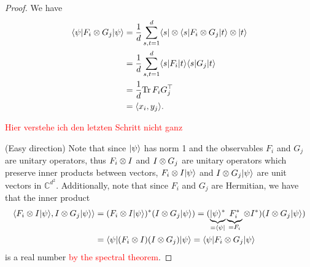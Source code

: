 \begin{proof}
	We have
	\begin{align*}
		\langle {\psi} \vert F_i\otimes G_j \vert {\psi} \rangle &= \frac{1}{d} \sum_{s,t=1}^d \langle {s} \vert\otimes\langle {s} \vert F_i\otimes G_j \vert {t} \rangle\otimes \vert {t} \rangle \\
		&= \frac{1}{d} \sum_{s,t=1}^d \langle {s} \vert F_i \vert {t} \rangle \langle {s} \vert G_j \vert {t} \rangle \\
		&= \frac{1}{d} \text{Tr} \, {F_iG_j^\top} \\
		&= \langle{x_i},{y_j}\rangle.
	\end{align*}
	
	\textcolor{red}{Hier verstehe ich den letzten Schritt nicht ganz}
	
	(Easy direction) Note that since $\vert {\psi} \rangle$ has norm 1 and the observables $F_i$ and $G_j$ are unitary operators, thus $F_i\otimes I$ and $I\otimes G_j$ are unitary operators which preserve inner products between vectors, $F_i\otimes I \vert {\psi} \rangle$ and $I\otimes G_j\vert {\psi} \rangle$ are unit vectors in $\mathbb{C}^{d^2}$. Additionally, note that since $F_i$ and $G_j$ are Hermitian, we have that the inner product
	\begin{align*}
		\sclr{F_i\tensor I \dr{\psi}}{I\tensor G_j \dr{\psi}} &= (F_i\tensor I \dr{\psi})^\ast(I\tensor G_j \dr{\psi}) 
		= (\underbrace{\dr{\psi}^\ast}_{=\dl{\psi}}\underbrace{F_i^\ast}_{=F_i}\tensor I^\ast)(I\tensor G_j \dr{\psi}) \\
		&= \dl{\psi}(F_i\tensor I)(I \tensor G_j) \dr{\psi}	%
		= \dl{\psi} F_i\tensor G_j \dr{\psi}
	\end{align*}
	is a real number \textcolor{red}{by the spectral theorem}.
	

\end{proof}

